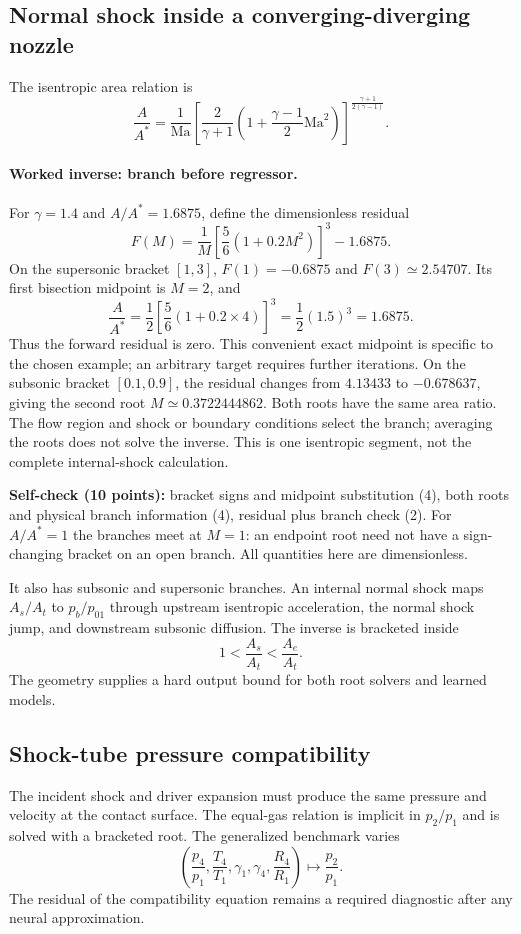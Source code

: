 \documentclass[11pt]{article}
\newcommand{\Ma}{\mathrm{Ma}}
\begin{document}
\subsection{Normal shock inside a converging-diverging nozzle}
The isentropic area relation is
\begin{equation}
\frac{A}{A^*}=\frac{1}{\Ma}
\left[\frac{2}{\gamma+1}
\left(1+\frac{\gamma-1}{2}\Ma^2\right)\right]^{\frac{\gamma+1}{2(\gamma-1)}}.
\end{equation}
\paragraph{Worked inverse: branch before regressor.}
For $\gamma=1.4$ and $A/A^*=1.6875$, define the dimensionless residual
\[
F(M)=\frac{1}{M}\left[\frac56(1+0.2M^2)\right]^3-1.6875.
\]
On the supersonic bracket $[1,3]$, $F(1)=-0.6875$ and
$F(3)\simeq2.54707$. Its first bisection midpoint is $M=2$, and
\[
\frac{A}{A^*}=\frac12\left[\frac56(1+0.2\times4)\right]^3
=\frac12(1.5)^3=1.6875.
\]
Thus the forward residual is zero. This convenient exact midpoint is specific
to the chosen example; an arbitrary target requires further iterations.
On the subsonic bracket $[0.1,0.9]$, the residual changes from $4.13433$
to $-0.678637$, giving the second root $M\simeq0.3722444862$.
Both roots have the same area ratio. The flow region and shock or boundary
conditions select the branch; averaging the roots does not solve the inverse.
This is one isentropic segment, not the complete internal-shock calculation.

\textbf{Self-check (10 points):} bracket signs and midpoint substitution (4),
both roots and physical branch information (4), residual plus branch check (2).
For $A/A^*=1$ the branches meet at $M=1$: an endpoint root need not have a
sign-changing bracket on an open branch. All quantities here are dimensionless.

It also has subsonic and supersonic branches. An internal normal shock maps
$A_s/A_t$ to $p_b/p_{01}$ through upstream isentropic acceleration, the normal
shock jump, and downstream subsonic diffusion. The inverse is bracketed inside
\begin{equation}
1 < \frac{A_s}{A_t} < \frac{A_e}{A_t}.
\end{equation}
The geometry supplies a hard output bound for both root solvers and learned models.

\subsection{Shock-tube pressure compatibility}
The incident shock and driver expansion must produce the same pressure and
velocity at the contact surface. The equal-gas relation is implicit in
$p_2/p_1$ and is solved with a bracketed root. The generalized benchmark varies
\begin{equation}
\left(\frac{p_4}{p_1},\frac{T_4}{T_1},\gamma_1,\gamma_4,\frac{R_4}{R_1}\right)
\longmapsto \frac{p_2}{p_1}.
\end{equation}
The residual of the compatibility equation remains a required diagnostic after
any neural approximation.
\end{document}
